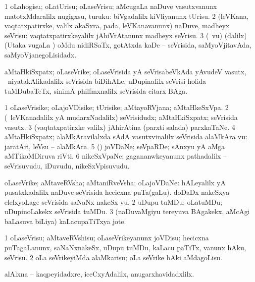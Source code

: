 \bentry
{}
\gl{\sakirx}
\bmng
\bnum
\num{1} oLahogisu; oLatUrisu; oLaseVrisu; aMcugaLa naDuve vasutxvanunx matotxMdaralilx nugigxsu, turuku:  biVgadalilx kiVliyanunx tUrisu. 
\num{2} (leVKana, vaqtatxpatirxke, \mo valilx akaSxra, pada, leVKanavanunx) naDuve, madheyx seVrisu:  vaqtatxpatirxkeyalilx jAhiVrAtanunx madheyx seVrisu. 
\num{3} (\aMrashA\ \mo vu) (\BUkaq dalilx) (Utaka \mo vugaLa \vi) oMdu nidiRSaTx, gotAtxda kaDe -- seVrisida, saMyoVjitavAda, saMyoVjanegoLisidadx. 
\enum
\emng
\eentry

\bentry
{}
\gl{\nA}
\bmng
aMtaHkiSxpatx; oLaseVrike; oLaseVrisida yA seVrisabeVkAda yAvudeV vasutx, \udA\ niyatakAlikadalilx seVrisida biDihALe, uDupinalilx seVrisi holida tuMDubaTeTx, sinimA philfmxnalilx seVrisida citarx BAga. 
\emng
\eentry

\bentry
{}
\gl{\nA}
\bmng
\bnum
\num{1} oLaseVrisike; oLajoVDisike; tUrisike; aMtayoRVjana; aMtaHkeSxVpa. 
\num{2} (\kanmu\ leVKanadalilx yA mudarxNadalilx) seVrisidudx; aMtaHkiSxpatx; seVrisida vasutx. 
\num{3} (vaqtatxpatirxke \mo valilx) jAhirAtina (parxti salada) parxkaTaNe. 
\num{4} aMtaHkiSxpatx; alaMkAravilalxda sAdA vasutxvinalilx seVrisida alaMkAra \mo vu:  jaratAri, leVsu -- alaMkAra. 
\num{5} (\aMrashA) joVDaNe; seVpaRDe; sAnxyu yA aMga aMTikoMDiruva riVti. 
\num{6} nikeSxVpaNe; gagananwkeyanunx pathadalilx -- seVrisuvudu, iDuvudu, nikeSxVpisuvudu. 
\enum
\emng
\eentry

\bentry
{}
\gl{\nA}
\bmng
\bnum
{} oLaseVrike; aMtaveRVsha; aMtaniRveVsha; oLajoVDaNe: 
\banum
{} hALeyalilx yA pusatxkadalilx naDuve seVrisida hecicxna puTa(gaLu). 
 doDaDx nakeSxya elelxyoLage seVrisida saNaNx nakeSx \mo vu. 
\eanum
\numie
\num{2} uDupu tuMDu; oLatuMDu; uDupinoLakekx seVrisida tuMDu. 
\num{3} (naDuvaMgiyu tereyuva BAgakekx, aMcAgi baLasuva biLiya) kaLacupaTiTxya jote. 
\enum
\emng
\eentry

\bentry
{}
\gl{\sakirx}
\bmng
\bnum
\num{1} oLaseVrisu; aMtaveRVshisu; oLaseVrikeyanunx joVDisu; hecicxna puTagaLanunx, saNaNxnakeSx, uDupu tuMDu, kaLacu paTiTx, \mo vanunx hAku, seVrisu. 
\num{2} oLa seVrikeyiMda alaMkarisu; oLa seVrike hAki aMdagoLisu. 
\enum
\emng
\eentry

\bentry
{}
\gl{\BAavayx}
\bmng
alAlxna -- kaqpeyidadxre, iceCxyAdalilx, anugarxhavidadxlilx. 
\emng
\eentry

